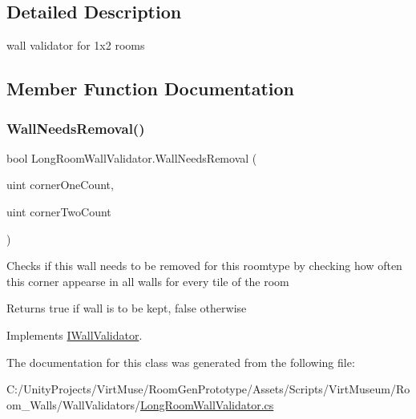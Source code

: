 \subsection{Detailed Description}
wall validator for 1x2 rooms 



\subsection{Member Function Documentation}
\mbox{\label{class_long_room_wall_validator_a552c1bbadec7bc3ab93a3fae2e512ebe}} 
\subsubsection{\texorpdfstring{Wall\+Needs\+Removal()}{WallNeedsRemoval()}}
{\footnotesize\ttfamily bool Long\+Room\+Wall\+Validator.\+Wall\+Needs\+Removal (\begin{DoxyParamCaption}\item[{uint}]{corner\+One\+Count,  }\item[{uint}]{corner\+Two\+Count }\end{DoxyParamCaption})}



Checks if this wall needs to be removed for this roomtype by checking how often this corner appearse in all walls for every tile of the room 

\begin{DoxyReturn}{Returns}
true if wall is to be kept, false otherwise
\end{DoxyReturn}


Implements \mbox{\hyperlink{interface_i_wall_validator_a1618acf45bf2614985aeb8b240bf7da8}{I\+Wall\+Validator}}.



The documentation for this class was generated from the following file\+:\begin{DoxyCompactItemize}
\item 
C\+:/\+Unity\+Projects/\+Virt\+Muse/\+Room\+Gen\+Prototype/\+Assets/\+Scripts/\+Virt\+Museum/\+Room\+\_\+\+Walls/\+Wall\+Validators/\mbox{\hyperlink{_long_room_wall_validator_8cs}{Long\+Room\+Wall\+Validator.\+cs}}\end{DoxyCompactItemize}
